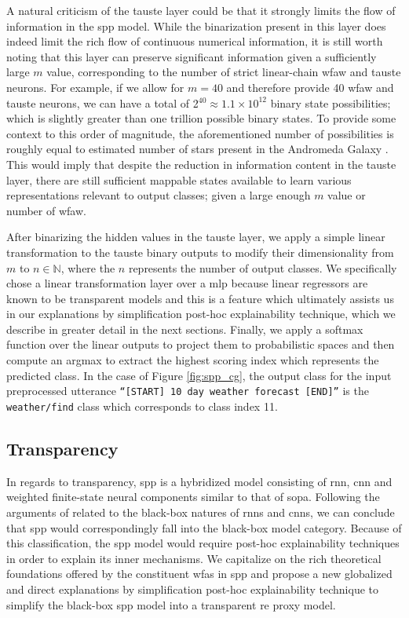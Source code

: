 A natural criticism of the \ac{tauste} layer could be that it strongly limits
the flow of information in the \ac{spp} model. While the binarization present in
this layer does indeed limit the rich flow of continuous numerical information,
it is still worth noting that this layer can preserve significant information
given a sufficiently large $m$ value, corresponding to the number of strict
linear-chain \ac{wfaw} and \ac{tauste} neurons. For example, if we allow for
$m=40$ and therefore provide 40 \ac{wfaw} and \ac{tauste} neurons, we can have a
total of 2$^{40}\approx1.1\times10^{12}$ binary state possibilities; which is
slightly greater than one trillion possible binary states. To provide some
context to this order of magnitude, the aforementioned number of possibilities
is roughly equal to estimated number of stars present in the Andromeda Galaxy
\citep{10.1093/mnras/stu879}. This would imply that despite the reduction in
information content in the \ac{tauste} layer, there are still sufficient
mappable states available to learn various representations relevant to output
classes; given a large enough $m$ value or number of \ac{wfaw}.

After binarizing the hidden values in the \ac{tauste} layer, we apply a simple linear
transformation to the \ac{tauste} binary outputs to modify their dimensionality from
$m$ to $n \in \mathbb{N}$, where the $n$ represents the number of output
classes. We specifically chose a linear transformation layer over a \ac{mlp} because
linear regressors are known to be transparent models
\citep{arrieta2020explainable} and this is a feature which ultimately assists us
in our explanations by simplification post-hoc explainability technique, which
we describe in greater detail in the next sections. Finally, we apply a softmax
function over the linear outputs to project them to probabilistic spaces and
then compute an argmax to extract the highest scoring index which represents the
predicted class. In the case of Figure \ref{fig:spp_cg}, the output class for
the input preprocessed utterance \texttt{``[START] 10 day weather forecast
  [END]''} is the \texttt{weather/find} class which corresponds to class index 11.

\subsection{Transparency}

\label{section:spp_transparency}

In regards to transparency, \ac{spp} is a hybridized model consisting of \ac{rnn},
\ac{cnn} and weighted finite-state neural components similar to that of \ac{sopa}.
Following the arguments of \citet{arrieta2020explainable} related to the
black-box natures of \ac{rnn}s and \ac{cnn}s, we can conclude that \ac{spp} would
correspondingly fall into the black-box model category. Because of this
classification, the \ac{spp} model would require post-hoc explainability
techniques in order to explain its inner mechanisms. We capitalize on the rich
theoretical foundations offered by the constituent \ac{wfas} in \ac{spp} and
propose a new globalized and direct explanations by simplification post-hoc
explainability technique to simplify the black-box \ac{spp} model into a
transparent \ac{re} proxy model.

